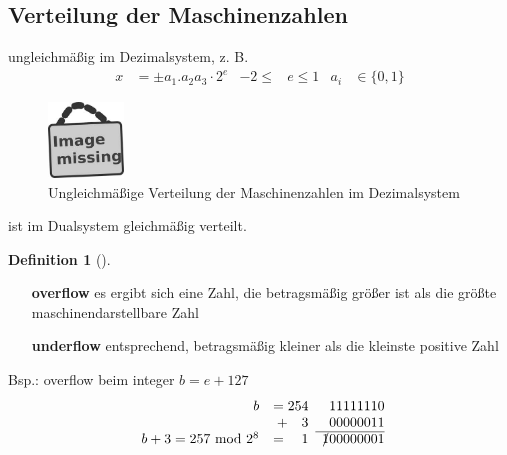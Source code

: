 \documentclass[ngerman,fontsize=11pt, paper=a4, parskip=half, titlepage=true, toc=bib]{scrbook}
\theoremstyle{definition}
\newtheorem{Def}{Definition}[section]		%
\theoremstyle{plain}
\newcommand{\subsectione}[1]{\addtocounter{Def}{1}\subsection{#1}}
\newenvironment{Defe}[1][]{ %
	\begin{Def}[#1]
	}
	{
	\end{Def}
	\addtocounter{subsection}{1}
}
\begin{document}
  \subsectione{Verteilung der Maschinenzahlen} \label{3.1.4}
  ungleichmäßig im Dezimalsystem, z. B.
  \begin{align*}
    x &= \pm a_1 . a_2 a_3 \cdot 2^e  & -2\leq & e\leq 1 & a_i & \in \{0,1\} 
  \end{align*}
  \begin{figure}
    \parbox{\linewidth}{
      \centering
      \includegraphics[width=2cm]{images/image_missing.jpg}
    }
    \caption{Ungleichmäßige Verteilung der Maschinenzahlen im Dezimalsystem}
  \end{figure}
  ist im Dualsystem gleichmäßig verteilt.

  \begin{Defe}
  	\label{3.1.5}~
  	\begin{itemize}
  		\item[\textbf{overflow}] es ergibt sich eine Zahl, die betragsmäßig größer ist als die größte maschinendarstellbare Zahl
  		\item[\textbf{underflow}] entsprechend, betragsmäßig kleiner als die kleinste positive Zahl
  	\end{itemize}
  	Bsp.: overflow beim integer $b=e+127$
  	\begin{align*}
  	\begin{array}{rrr@{}}
  	b &= 254                                &11111110 \\
  	&+  \phantom{24}3 &00000011 \\
  	\cline{3-3} %
  	b+3 = 257 \text{ mod } 2^8  &=\phantom{24}1& \xout{1}00000001 
  	\end{array}	  
  	\end{align*}
  \end{Defe}
\end{document}
